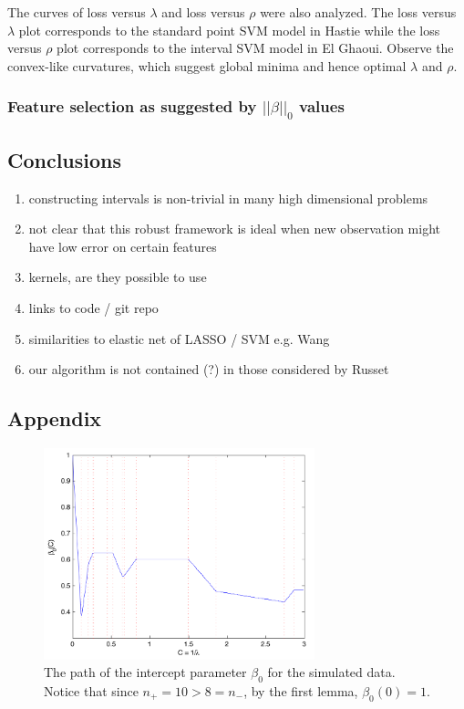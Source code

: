 \documentclass[10pt]{article}
\theoremstyle{definition}
\begin{document}
The curves of loss versus $\lambda$ and loss versus $\rho$ were also analyzed.  The loss versus $\lambda$ plot corresponds to the standard point SVM model in Hastie while the loss versus $\rho$ plot corresponds to the interval SVM model in El Ghaoui. Observe the convex-like curvatures, which suggest global minima and hence optimal $\lambda$ and $\rho$. 

\subsubsection{Feature selection as suggested by $||\beta||_0$ values}



\subsection{Conclusions}
\begin{enumerate}
\item constructing intervals is non-trivial in many high dimensional problems
\item not clear that this robust framework is ideal when new observation might have low error on certain features
\item kernels, are they possible to use
\item links to code / git repo
\item similarities to elastic net of LASSO / SVM e.g. Wang \cite{wang2007hybrid}
\item our algorithm is not contained (?) in those considered by Russet \cite{rosset2007piecewise}
\end{enumerate}


\subsection{Appendix}
\begin{center}
\begin{figure}[!h]
   \centering
   \includegraphics[width=0.7\textwidth]{./beta0Path.pdf} 
      \caption{The path of the intercept parameter $\beta_0$ for the simulated data. Notice that since $n_+=10>8=n_-$, by the first lemma, $\beta_0(0)=1$.}
   \label{fig:beta0Path}
\end{figure}
\end{center}
\end{document}
